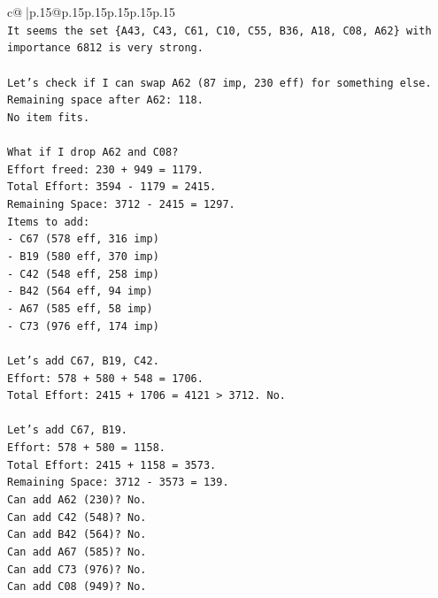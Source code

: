 \documentclass{article}
\begin{document}
{\begin{supertabular}{c@{$\;$}|p{.15\linewidth}@{}p{.15\linewidth}p{.15\linewidth}p{.15\linewidth}p{.15\linewidth}p{.15\linewidth}}
{{{\\ 
\texttt{It seems the set \{A43, C43, C61, C10, C55, B36, A18, C08, A62\} with importance 6812 is very strong.} \\
\\ 
\texttt{Let's check if I can swap A62 (87 imp, 230 eff) for something else.} \\
\texttt{Remaining space after A62: 118.} \\
\texttt{No item fits.} \\
\\ 
\texttt{What if I drop A62 and C08?} \\
\texttt{Effort freed: 230 + 949 = 1179.} \\
\texttt{Total Effort: 3594 {-} 1179 = 2415.} \\
\texttt{Remaining Space: 3712 {-} 2415 = 1297.} \\
\texttt{Items to add:} \\
\texttt{{-} C67 (578 eff, 316 imp)} \\
\texttt{{-} B19 (580 eff, 370 imp)} \\
\texttt{{-} C42 (548 eff, 258 imp)} \\
\texttt{{-} B42 (564 eff, 94 imp)} \\
\texttt{{-} A67 (585 eff, 58 imp)} \\
\texttt{{-} C73 (976 eff, 174 imp)} \\
\\ 
\texttt{Let's add C67, B19, C42.} \\
\texttt{Effort: 578 + 580 + 548 = 1706.} \\
\texttt{Total Effort: 2415 + 1706 = 4121 > 3712. No.} \\
\\ 
\texttt{Let's add C67, B19.} \\
\texttt{Effort: 578 + 580 = 1158.} \\
\texttt{Total Effort: 2415 + 1158 = 3573.} \\
\texttt{Remaining Space: 3712 {-} 3573 = 139.} \\
\texttt{Can add A62 (230)? No.} \\
\texttt{Can add C42 (548)? No.} \\
\texttt{Can add B42 (564)? No.} \\
\texttt{Can add A67 (585)? No.} \\
\texttt{Can add C73 (976)? No.} \\
\texttt{Can add C08 (949)? No.} \\
\\ 
}}}
\end{supertabular}}
\end{document}
